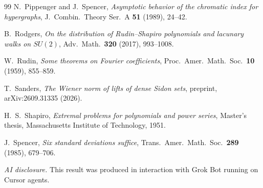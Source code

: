 \documentclass[11pt,reqno]{amsart}
\theoremstyle{definition}
\begin{document}
\begin{thebibliography}{99}
 N.~Pippenger and J.~Spencer, \emph{Asymptotic behavior of the chromatic index for hypergraphs}, J.\ Combin.\ Theory Ser.\ A \textbf{51} (1989), 24--42.

 B.~Rodgers, \emph{On the distribution of Rudin--Shapiro polynomials and lacunary walks on $SU(2)$}, Adv.\ Math.\ \textbf{320} (2017), 993--1008.

 W.~Rudin, \emph{Some theorems on Fourier coefficients}, Proc.\ Amer.\ Math.\ Soc.\ \textbf{10} (1959), 855--859.

 T.~Sanders, \emph{The Wiener norm of lifts of dense Sidon sets}, preprint, arXiv:2609.31335 (2026).

 H.~S.~Shapiro, \emph{Extremal problems for polynomials and power series}, Master's thesis, Massachusetts Institute of Technology, 1951.

 J.~Spencer, \emph{Six standard deviations suffice}, Trans.\ Amer.\ Math.\ Soc.\ \textbf{289} (1985), 679--706.

\end{thebibliography}

\bigskip
\noindent\emph{AI disclosure.} This result was produced in interaction with Grok Bot running on Cursor agents.
\end{document}
